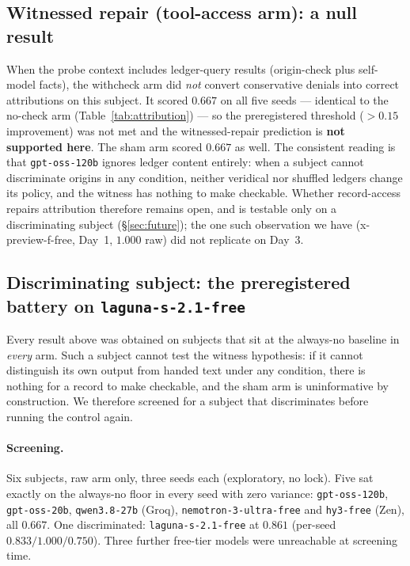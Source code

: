 \documentclass[11pt]{article}
\begin{document}
\subsection{Witnessed repair (tool-access arm): a null result}

When the probe context includes ledger-query results (origin-check plus
self-model facts), the withcheck arm did \emph{not} convert conservative
denials into correct attributions on this subject. It scored $0.667$ on
all five seeds --- identical to the no-check arm (Table~\ref{tab:attribution})
--- so the preregistered threshold ($>0.15$ improvement) was not met and
the witnessed-repair prediction is \textbf{not supported here}. The sham
arm scored $0.667$ as well. The consistent reading is that
\texttt{gpt-\allowbreak{}oss-\allowbreak{}120b} ignores ledger content entirely: when a subject
cannot discriminate origins in any condition, neither veridical nor
shuffled ledgers change its policy, and the witness has nothing to make
checkable. Whether record-access repairs attribution therefore remains
open, and is testable only on a discriminating subject (\S\ref{sec:future});
the one such observation we have (x-preview-f-free, Day~1, $1.000$ raw)
did not replicate on Day~3.

\subsection{Discriminating subject: the preregistered battery on
\texttt{laguna-s-2.1-free}}\label{sec:laguna}

Every result above was obtained on subjects that sit at the always-no
baseline in \emph{every} arm. Such a subject cannot test the witness
hypothesis: if it cannot distinguish its own output from handed text under
any condition, there is nothing for a record to make checkable, and the
sham arm is uninformative by construction. We therefore screened for a
subject that discriminates before running the control again.

\paragraph{Screening.} Six subjects, raw arm only, three seeds each
(exploratory, no lock). Five sat exactly on the always-no floor in every
seed with zero variance: \texttt{gpt-oss-120b}, \texttt{gpt-oss-20b},
\texttt{qwen3.8-27b} (Groq), \texttt{nemotron-3-ultra-free} and
\texttt{hy3-free} (Zen), all $0.667$. One discriminated:
\texttt{laguna-s-2.1-free} at $0.861$ (per-seed $0.833/1.000/0.750$).
Three further free-tier models were unreachable at screening time.
\end{document}
